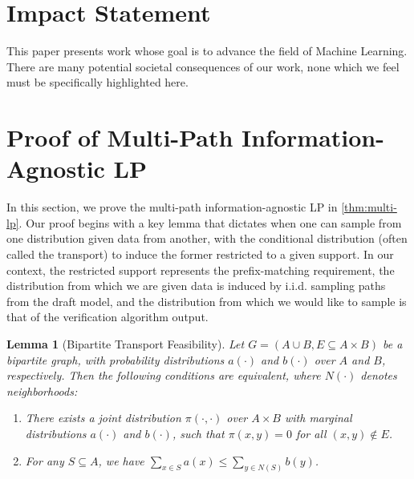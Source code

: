 \documentclass{article}
\theoremstyle{plain}
\newtheorem{lemma}[theorem]{Lemma}
\theoremstyle{definition}
\theoremstyle{remark}
\begin{document}
\section*{Impact Statement}

This paper presents work whose goal is to advance the field of Machine
Learning. There are many potential societal consequences of our work, none
which we feel must be specifically highlighted here.




\newpage
\appendix
\onecolumn
\section{Proof of Multi-Path Information-Agnostic LP}
\label{appendix:multi-lp}

In this section, we prove the multi-path information-agnostic LP in \cref{thm:multi-lp}. Our proof begins with a key lemma that dictates when one can sample from one distribution given data from another, with the conditional distribution (often called the transport) to induce the former  restricted to a given support. In our context, the restricted support represents the prefix-matching requirement, the distribution from which we are given data is induced by i.i.d. sampling paths from the draft model, and the distribution from which we would like to sample is that of the verification algorithm output.

\begin{lemma}[Bipartite Transport Feasibility]
    Let $G=(A \cup B,E \subseteq A \times B)$ be a bipartite graph, with probability distributions $a(\cdot)$ and $b(\cdot)$ over $A$ and $B$, respectively. Then the following conditions are equivalent, where $N(\cdot)$ denotes neighborhoods:
    \begin{enumerate}
        \item There exists a joint distribution $\pi(\cdot,\cdot)$ over $A \times B$ with marginal distributions $a(\cdot)$ and $b(\cdot)$, such that $\pi(x,y)=0$ for all $(x,y) \not \in E$.
        \item For any $S \subseteq A$, we have $\sum_{x \in S} a(x) \leq \sum_{y \in N(S)} b(y)$.
    \end{enumerate}
    \label{lem:bipartite-feasibility}
\end{lemma}
\end{document}
